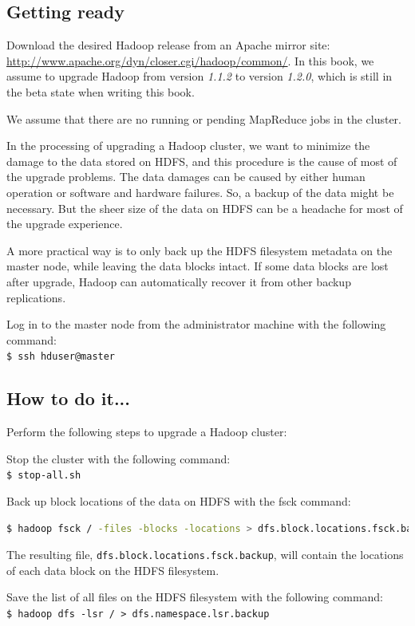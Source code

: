 \subsection*{Getting ready}
Download the desired Hadoop release from an Apache mirror site: \url{http://www.apache.org/dyn/closer.cgi/hadoop/common/}. In this book, we assume to upgrade Hadoop from version \emph{1.1.2} to version \emph{1.2.0}, which is still in the beta state when writing this book.

We assume that there are no running or pending MapReduce jobs in the cluster.

In the processing of upgrading a Hadoop cluster, we want to minimize the damage to the data stored on HDFS, and this procedure is the cause of most of the upgrade problems. The data damages can be caused by either human operation or software and hardware failures. So, a backup of the data might be necessary. But the sheer size of the data on HDFS can be a headache for most of the upgrade experience.

A more practical way is to only back up the HDFS filesystem metadata on the master node, while leaving the data blocks intact. If some data blocks are lost after upgrade, Hadoop can automatically recover it from other backup replications.

Log in to the master node from the administrator machine with the following command: \\
\verb|$ ssh hduser@master|

\subsection*{How to do it...}
Perform the following steps to upgrade a Hadoop cluster: 

Stop the cluster with the following command: \\
\verb|$ stop-all.sh|

Back up block locations of the data on HDFS with the fsck command:
\lstset{style=bashstyle}
\begin{lstlisting}[language=bash]
$ hadoop fsck / -files -blocks -locations > dfs.block.locations.fsck.backup
\end{lstlisting}

The resulting file, \verb|dfs.block.locations.fsck.backup|, will contain the locations of each data block on the HDFS filesystem.

Save the list of all files on the HDFS filesystem with the following command: \\
\verb|$ hadoop dfs -lsr / > dfs.namespace.lsr.backup|

